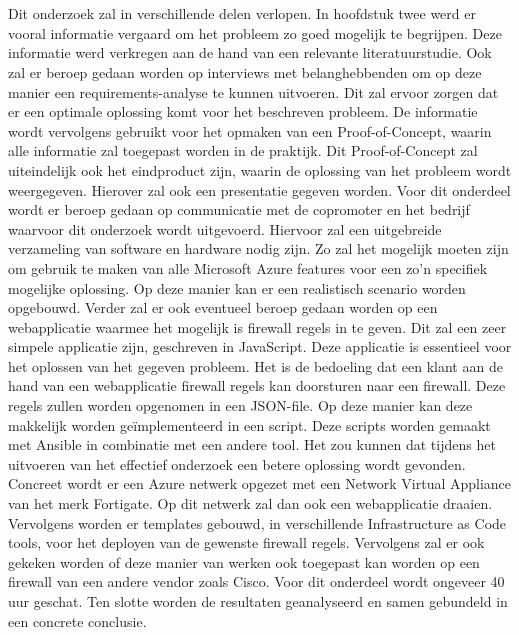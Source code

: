 
\chapter{}%
\label{ch:methodologie}
Dit onderzoek zal in verschillende delen verlopen. In hoofdstuk twee werd er vooral informatie vergaard om het probleem zo goed mogelijk te begrijpen. Deze informatie werd verkregen aan de hand van een relevante literatuurstudie. Ook zal er beroep gedaan worden op interviews met belanghebbenden om op deze manier een requirements-analyse te kunnen uitvoeren. Dit zal ervoor zorgen dat er een optimale oplossing komt voor het beschreven probleem. De informatie wordt vervolgens gebruikt voor het opmaken van een Proof-of-Concept, waarin alle informatie zal toegepast worden in de praktijk. Dit Proof-of-Concept zal uiteindelijk ook het eindproduct zijn, waarin de oplossing van het probleem wordt weergegeven. Hierover zal ook een presentatie gegeven worden. Voor dit onderdeel wordt er beroep gedaan op communicatie met de copromoter en het bedrijf waarvoor dit onderzoek wordt uitgevoerd. Hiervoor zal een uitgebreide verzameling van software en hardware nodig zijn. Zo zal het mogelijk moeten zijn om gebruik te maken van alle Microsoft Azure features voor een zo'n specifiek mogelijke oplossing. Op deze manier kan er een realistisch scenario worden opgebouwd. Verder zal er ook eventueel beroep gedaan worden op een webapplicatie waarmee het mogelijk is firewall regels in te geven. Dit zal een zeer simpele applicatie zijn, geschreven in JavaScript. Deze applicatie is essentieel voor het oplossen van het gegeven probleem. Het is de bedoeling dat een klant aan de hand van een webapplicatie firewall regels kan doorsturen naar een firewall. Deze regels zullen worden opgenomen in een JSON-file. Op deze manier kan deze makkelijk worden geïmplementeerd in een script. Deze scripts worden gemaakt met Ansible in combinatie met een andere tool.  
Het zou kunnen dat tijdens het uitvoeren van het effectief onderzoek een betere oplossing wordt gevonden.
Concreet wordt er een Azure netwerk opgezet met een Network Virtual Appliance van het merk Fortigate. Op dit netwerk zal dan ook een webapplicatie draaien. Vervolgens worden er templates gebouwd, in verschillende Infrastructure as Code tools, voor het deployen van de gewenste firewall regels. Vervolgens zal er ook gekeken worden of deze manier van werken ook toegepast kan worden op een firewall van een andere vendor zoals Cisco. Voor dit onderdeel wordt ongeveer 40 uur geschat. Ten slotte worden de resultaten geanalyseerd en samen gebundeld in een concrete conclusie. 



